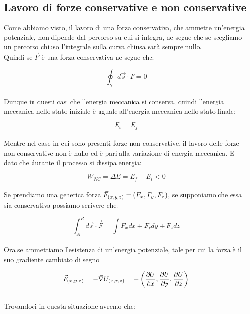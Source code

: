 \subsection{Lavoro di forze conservative e non conservative}
Come abbiamo visto, il lavoro di una forza conservativa, che ammette
un'energia potenziale, non dipende dal percorso su cui si integra, ne segue
che se scegliamo un percorso chiuso l'integrale sulla curva chiusa sarà
sempre nullo.\\
Quindi se $\vec F$ è una forza conservativa ne segue che:

\begin{equation}
    \boxed{\oint_\gamma d\vec s \cdot F = 0}
\label{eq:work&energy:conservative_force}
\end{equation}
\\
Dunque in questi casi che l'energia meccanica si conserva, quindi l'energia
meccanica nello stato iniziale è uguale all'energia meccanica nello stato
finale:

\begin{equation}
    \boxed{E_i = E_f}
\label{eq:work&energy:Ei=Ef}
\end{equation}
\\
Mentre nel caso in cui sono presenti forze non conservative, il lavoro delle
forze non conservative non è nullo ed è pari alla variazione di energia
meccanica. E dato che durante il processo si dissipa energia:

\begin{equation}
    \boxed{W_{NC} = \Delta E = E_f- E_i < 0}
\label{eq:work&energy:Ei>Ef}
\end{equation}
\\
Se prendiamo una generica forza $\vec F_{\left( x,y,z\right)} = \left( F_x,F_y,F_z\right)$,
se supponiamo che essa sia conservativa possiamo scrivere che:

\begin{equation}
    \int_A^Bd\vec s\cdot \vec F = \int F_xdx+F_ydy+F_zdz
\end{equation}
\\
Ora se ammettiamo l'esistenza di un'energia potenziale, tale per cui la forza
è il suo gradiente cambiato di segno:

\begin{equation}
    \vec F_{\left( x,y,z\right)} = -\vec\nabla U_{\left( x,y,z\right)} = 
    -\left(\frac{\partial U}{\partial x},\frac{\partial U}{\partial y},
    \frac{\partial U}{\partial z}\right)
\label{eq:work&energy:gradient}
\end{equation}
\\
Trovandoci in questa situazione avremo che:


